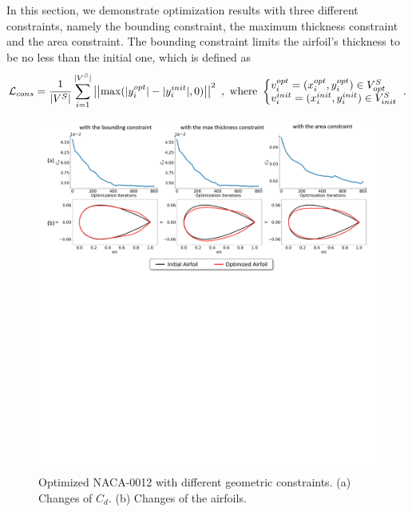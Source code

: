In this section, we demonstrate optimization results with three different constraints, namely the bounding constraint, the maximum thickness constraint and the area constraint.
The bounding constraint limits the airfoil's thickness to be no less than the initial one, which is defined as
\begin{equation}
    {\cL_{cons}} = \frac{1}{{|{V^S}|}}\sum\limits_{i = 1}^{|{V^S}|} \left|\left|{\max (|y_i^{opt}| - |y_i^{init}|,0)}\right|\right|^2
    \,\,,\,\, \text{where}\,\,
    \left\{ 
        \begin{matrix}
      v_i^{opt} = (x_i^{opt},y_i^{opt}) \in V_{opt}^S \hfill \cr 
      v_i^{init} = (x_i^{init},y_i^{init}) \in V_{init}^S \hfill \cr 
        \end{matrix}
  \right.
  \,\,.
\end{equation}

\begin{figure}[!thb]
	\begin{center}
		\includegraphics[width=1\linewidth]{chapter3/tex/figures/experiment/shape_optimization_case.pdf}
	\end{center}
	\caption{
		\small Optimized NACA-0012 with different geometric constraints. (a) Changes of $C_d$. (b) Changes of the airfoils.
	}
	\label{ch3:fig:exp_shape_optim_case}
\end{figure}

